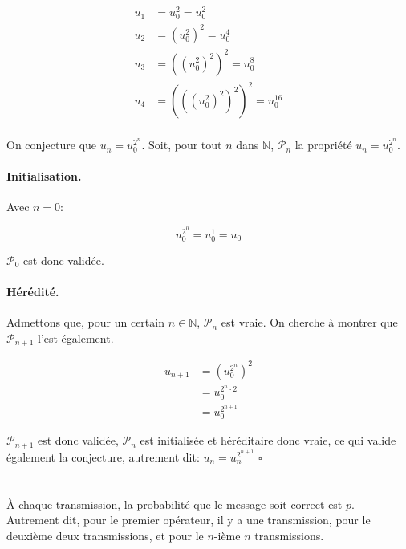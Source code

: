 \documentclass{article}
\newcommand{\N}{\mathds{N}}
\newcommand{\qed}{\square}
\newcommand{\spliteq}[1]{\begin{equation*}\begin{split}#1\end{split}\end{equation*}}
\begin{document}
\section{}

\spliteq{
	u_1 &= u_0^2 = u_0^2\\
	u_2 &= (u_0^2)^2 = u_0^4 \\
	u_3 &= ((u_0^2)^2)^2 = u_0^8\\
	u_4 &= (((u_0^2)^2)^2)^2 = u_0^{16} \\
}

On conjecture que $u_n = u_0^{2^n}$.
Soit, pour tout $n$ dans $\N$, $\mathcal{P}_n$ la propriété $u_n = u_0^{2^n}$.

\paragraph{Initialisation.} Avec $n=0$:

\[
	u_0^{2^0} = u_0^1 = u_0
\]

$\mathcal{P}_0$ est donc validée.


\paragraph{Hérédité.} Admettons que, pour un certain $n \in \N$, $\mathcal{P}_{n}$ est vraie. On cherche à montrer que $\mathcal{P}_{n+1}$ l'est également.

\spliteq{
	u_{n+1} &= (u_0^{2^n})^2 \\
		&= u_0^{2^n\cdot2} \\
		&= u_0^{2^{n+1}}
}

$\mathcal{P}_{n+1}$ est donc validée, $\mathcal{P}_{n}$ est initialisée et héréditaire donc vraie, ce qui valide également la conjecture, autrement dit: $u_n = u_n^{2^{n+1}}$ $\qed$


\section{} %

\section{} %

\section{} %

À chaque transmission, la probabilité que le message soit correct est $p$. Autrement dit,
pour le premier opérateur, il y a une transmission, pour le deuxième deux transmissions,
et pour le $n$-ième $n$ transmissions.
\end{document}
